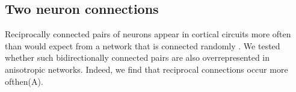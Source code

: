 \clearpage
\pagebreak
\newpage

\subsection*{Two neuron connections}

Reciprocally connected pairs of neurons appear in cortical circuits
more often than would expect from a network that is connected randomly
\cite{Markram1997, Song2005, Perin2011}. We tested whether such
bidirectionally connected pairs are also overrepresented in
anisotropic networks. Indeed, we find that reciprocal connections
occur more ofthen(A).



